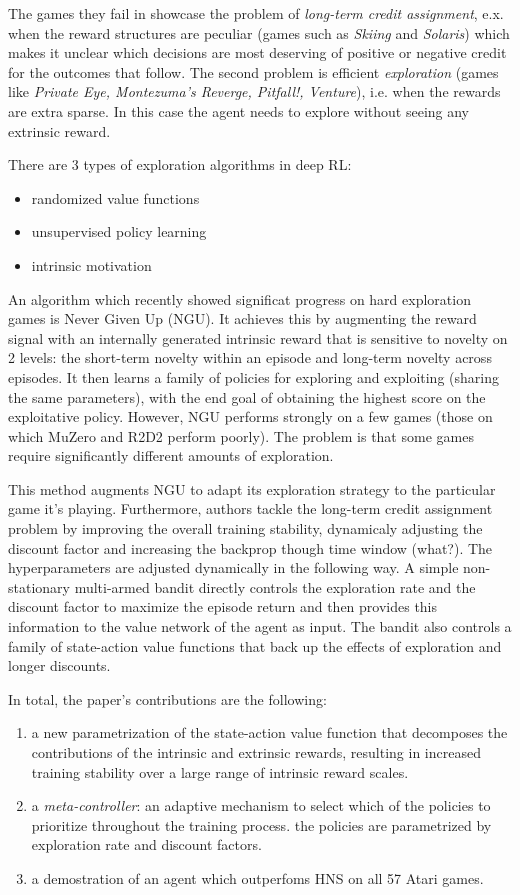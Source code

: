 \documentclass{article}
\begin{document}
The games they fail in showcase the problem of \textit{long-term credit assignment}, e.x. when
the reward structures are peculiar (games such as \textit{Skiing} and \textit{Solaris}) which
makes it unclear which decisions are most deserving of positive or negative credit for 
the outcomes that follow.
The second problem is efficient \textit{exploration} (games like \textit{Private Eye, Montezuma's Reverge, Pitfall!, Venture}),
i.e. when the rewards are extra sparse.
In this case the agent needs to explore without seeing any extrinsic reward.

There are 3 types of exploration algorithms in deep RL:
\begin{itemize}
		\item randomized value functions
		\item unsupervised policy learning
		\item	 intrinsic motivation
\end{itemize}
An algorithm which recently showed significat progress on hard exploration games is Never Given Up (NGU).
It achieves this by augmenting the reward signal with an internally generated intrinsic reward
that is sensitive to novelty on 2 levels: the short-term novelty within an episode
and long-term novelty across episodes. It then learns a family of policies for exploring and exploiting (sharing the same parameters),
with the end goal of obtaining the highest score on the exploitative policy.
However, NGU performs strongly on a few games (those on which MuZero and R2D2 perform poorly).
The problem is that some games require significantly different amounts of exploration.

This method augments NGU to adapt its exploration strategy to the particular game it's playing.
Furthermore, authors tackle the long-term credit assignment problem by improving the overall
training stability, dynamicaly adjusting the discount factor and increasing the backprop though time window (what?).
The hyperparameters are adjusted dynamically in the following way. A simple non-stationary multi-armed
bandit directly controls the exploration rate and the discount factor to maximize the episode return
and then provides this information to the value network of the agent as input.
The bandit also controls a family of state-action value functions that back up the effects of exploration
and longer discounts.

In total, the paper's contributions are the following:
\begin{enumerate}
		\item a new parametrization of the state-action value function that decomposes the contributions of the intrinsic 
				and extrinsic rewards, resulting in increased training stability over a large range of intrinsic reward scales.
		\item a \textit{meta-controller}: an adaptive mechanism to select which of the policies to prioritize throughout
				the training process. the policies are parametrized by exploration rate and discount factors.
		\item a demostration of an agent which outperfoms HNS on all 57 Atari games.
\end{enumerate}
\end{document}
